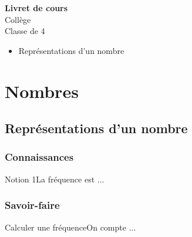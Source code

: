 \documentclass[a4paper,11pt,twoside]{article}
\begin{document}
\providecommand{\theHExoNum}{\theExoNum}
\providecommand{\theHNotionNum}{\theNotionNum}
\providecommand{\theHMethodeNum}{\theMethodeNum}
\providecommand{\theHDefinitionNum}{\theDefinitionNum}
\providecommand{\theHProprieteNum}{\theProprieteNum}

\seqCreeCompteurs
{}
\seqInitAnnexes

\thispagestyle{empty}
\begin{center}
\vspace*{2em}
{\Huge\bfseries Livret de cours}\\[2em]
{\Large Collège}\\[1em]
{\LARGE Classe de 4\ieme{}}\\[3em]
\end{center}

\begin{itemize}
  \item Représentations d'un nombre
\end{itemize}

\newpage

\thispagestyle{empty}
\tableofcontents
\newpage

\cleardoublepage
{}
\section{Nombres}

\subsection{Représentations d'un nombre}

\subsubsection{Connaissances}

\begin{seqNotion}{Notion 1}{La fréquence est ...}
\end{seqNotion}

\subsubsection{Savoir-faire}

\begin{seqMethode}{Calculer une fréquence}{On compte ...}
\end{seqMethode}

\seqAfficheAnnexes
\end{document}
